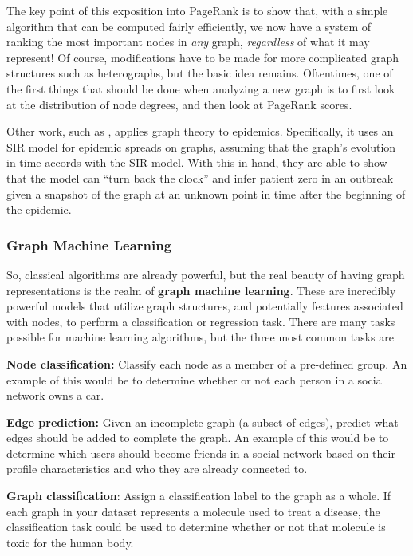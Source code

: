 \documentclass[12pt]{article}
\theoremstyle{definition}
\begin{document}
The key point of this exposition into PageRank is to show that, with a simple algorithm that can be computed fairly efficiently, we now have a system of ranking the most important nodes in \textit{any} graph, \textit{regardless} of what it may represent! Of course, modifications have to be made for more complicated graph structures such as heterographs, but the basic idea remains. Oftentimes, one of the first things that should be done when analyzing a new graph is to first look at the distribution of node degrees, and then look at PageRank scores.

Other work, such as \cite{PhysRevLetterBayesianInferenceNetworksBeliefProp}, applies graph theory to epidemics. Specifically, it uses an SIR model for epidemic spreads \cite{SIRmodel} on graphs, assuming that the graph's evolution in time accords with the SIR model. With this in hand, they are able to show that the model can ``turn back the clock'' and infer patient zero in an outbreak given a snapshot of the graph at an unknown point in time after the beginning of the epidemic.

\subsubsection{Graph Machine Learning}

So, classical algorithms are already powerful, but the real beauty of having graph representations is the realm of \textbf{graph machine learning}. These are incredibly powerful models that utilize graph structures, and potentially features associated with nodes, to perform a classification or regression task. There are many tasks possible for machine learning algorithms, but the three most common tasks are

\textbf{Node classification:} Classify each node as a member of a pre-defined group. An example of this would be to determine whether or not each person in a social network owns a car.

\textbf{Edge prediction:} Given an incomplete graph (a subset of edges), predict what edges should be added to complete the graph. An example of this would be to determine which users should become friends in a social network based on their profile characteristics and who they are already connected to.

\textbf{Graph classification}: Assign a classification label to the graph as a whole. If each graph in your dataset represents a molecule used to treat a disease, the classification task could be used to determine whether or not that molecule is toxic for the human body.
\end{document}
